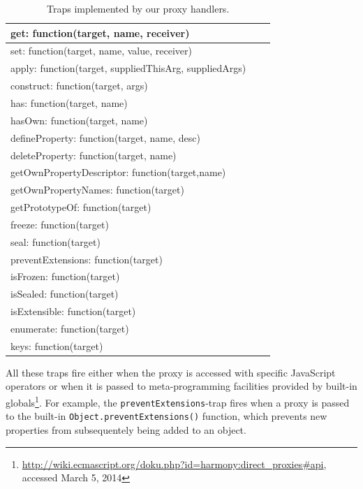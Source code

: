 \begin{table}[h]
\begin{center}
\begin{tabular}{|l|l|r|}
\hline
get: function(target, name, receiver) \\ \hline
set: function(target, name, value, receiver) \\ \hline
apply: function(target, suppliedThisArg, suppliedArgs) \\ \hline
construct: function(target, args) \\ \hline
has: function(target, name) \\ \hline
hasOwn: function(target, name) \\ \hline
defineProperty: function(target, name, desc) \\ \hline
deleteProperty: function(target, name) \\ \hline
getOwnPropertyDescriptor: function(target,name) \\ \hline
getOwnPropertyNames: function(target) \\ \hline
getPrototypeOf: function(target) \\ \hline
freeze: function(target) \\ \hline
seal: function(target) \\ \hline
preventExtensions: function(target) \\ \hline
isFrozen: function(target) \\ \hline
isSealed: function(target) \\ \hline
isExtensible: function(target) \\ \hline
enumerate: function(target) \\ \hline
keys: function(target) \\ \hline
\end{tabular}
\caption[Table caption text]{Traps implemented by our proxy handlers.}
\label{table:traps}
\end{center}
\end{table}

All these traps fire either when the proxy is accessed with specific JavaScript operators or when it is passed to meta-programming facilities provided by built-in globals\footnote{\url{http://wiki.ecmascript.org/doku.php?id=harmony:direct_proxies\#api}, accessed March 5, 2014}.
For example, the \lstinline{preventExtensions}-trap fires when a proxy is passed to the built-in \lstinline{Object.preventExtensions()} function, which prevents new properties from subsequentely being added to an object.



